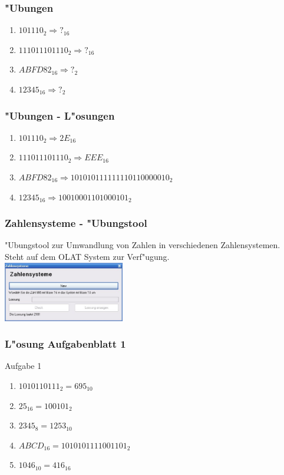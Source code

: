 \documentclass{beamer}
\begin{document}
\frame
{
	\frametitle{"Ubungen}
	\begin{enumerate}
	\item $101110_{2} \Rightarrow ?_{16}$
	\item $111011101110_{2} \Rightarrow ?_{16}$
	\item $ABFD82_{16} \Rightarrow ?_{2}$
	\item $12345_{16} \Rightarrow ?_{2}$
	\end{enumerate}
}

\frame
{
	\frametitle{"Ubungen - L"osungen}
	\begin{enumerate}
	\item $101110_{2} \Rightarrow 2E_{16}$
	\item $111011101110_{2} \Rightarrow EEE_{16}$
	\item $ABFD82_{16} \Rightarrow 101010111111110110000010_{2}$
	\item $12345_{16} \Rightarrow 10010001101000101_{2}$
	\end{enumerate}
}

\frame
{
	\frametitle{Zahlensysteme - "Ubungstool}
	"Ubungstool zur Umwandlung von Zahlen in verschiedenen Zahlensystemen. Steht auf dem OLAT System zur Verf"ugung.\\
	\includegraphics[width=150pt]{zahlensysteme.ps}
}

\frame
{
	\frametitle{L"osung Aufgabenblatt 1}
	Aufgabe 1
	\begin{enumerate}
	\item $1010110111_{2} = 695_{10}$
	\item $25_{16} = 100101_{2}$
	\item $2345_{8} = 1253_{10}$
	\item $ABCD_{16} = 1010101111001101_{2}$
	\item $1046_{10} = 416_{16}$
	\end{enumerate}
}
\end{document}

